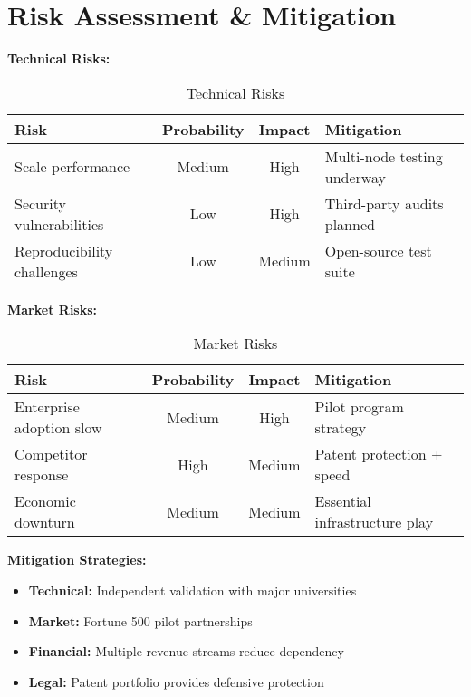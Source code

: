\documentclass{article}
\begin{document}
\section{Risk Assessment \& Mitigation}
\textbf{Technical Risks:}

\begin{table}[h]
\centering
\begin{tabular}{|l|c|c|l|}
\hline
\textbf{Risk} & \textbf{Probability} & \textbf{Impact} & \textbf{Mitigation} \\
\hline
Scale performance & Medium & High & Multi-node testing underway \\
Security vulnerabilities & Low & High & Third-party audits planned \\
Reproducibility challenges & Low & Medium & Open-source test suite \\
\hline
\end{tabular}
\caption{Technical Risks}
\end{table}

\textbf{Market Risks:}

\begin{table}[h]
\centering
\begin{tabular}{|l|c|c|l|}
\hline
\textbf{Risk} & \textbf{Probability} & \textbf{Impact} & \textbf{Mitigation} \\
\hline
Enterprise adoption slow & Medium & High & Pilot program strategy \\
Competitor response & High & Medium & Patent protection + speed \\
Economic downturn & Medium & Medium & Essential infrastructure play \\
\hline
\end{tabular}
\caption{Market Risks}
\end{table}

\textbf{Mitigation Strategies:}
\begin{itemize}
    \item \textbf{Technical:} Independent validation with major universities
    \item \textbf{Market:} Fortune 500 pilot partnerships
    \item \textbf{Financial:} Multiple revenue streams reduce dependency
    \item \textbf{Legal:} Patent portfolio provides defensive protection
\end{itemize}
\end{document}
